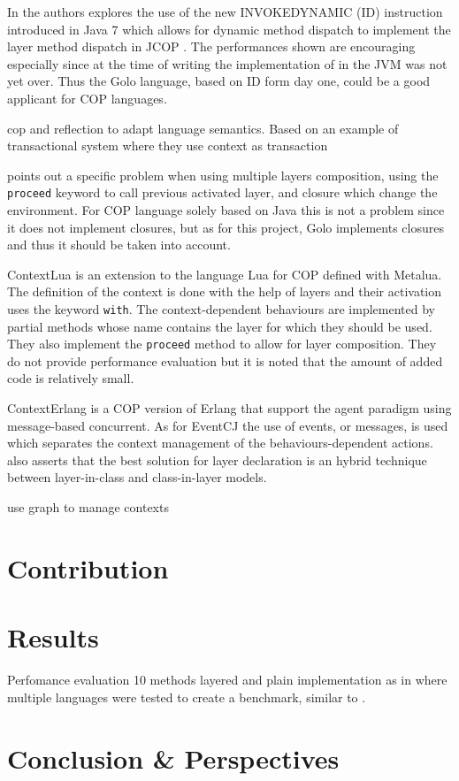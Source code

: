 \documentclass[a4paper]{article}
\begin{document}
In \cite{appeltauer_layered_2010} the authors explores the use of the new INVOKEDYNAMIC (ID) instruction introduced in Java 7 which allows for dynamic method dispatch to implement the layer method dispatch in JCOP \cite{appeltauer_declarative_2013}. The performances shown are encouraging especially since at the time of writing the implementation of in the JVM was not yet over. Thus the Golo language, based on ID form day one, could be a good applicant for COP languages.

\cite{gonzalez_transactional_2009} cop and reflection to adapt language semantics. Based on an example of transactional system where they use context as transaction

\cite{clarke_how_2009} points out a specific problem when using multiple layers composition, using the \lstinline|proceed| keyword to call previous activated layer, and closure which change the environment. For COP language solely based on Java this is not a problem since it does not implement closures, but as for this project, Golo implements closures and thus it should be taken into account. 

ContextLua \cite{wasty_contextlua:_2010} is an extension to the language Lua for COP defined with Metalua. The definition of the context is done with the help of layers and their activation uses the keyword \lstinline|with|. The context-dependent behaviours are implemented by partial methods whose name contains the layer for which they should be used. They also implement the \lstinline|proceed| method to allow for layer composition. They do not provide performance evaluation but it is noted that the amount of added code is relatively small.

ContextErlang \cite{ghezzi_context_2010} is a COP version of Erlang that support the agent paradigm using message-based concurrent. As for EventCJ \cite{kamina_eventcj:_2011} the use of events, or messages, is used which separates the context management of the behaviours-dependent actions.  \cite{ghezzi_context_2010} also asserts that the best solution for layer declaration is an hybrid technique between layer-in-class and class-in-layer models.

\cite{schippers_graph-based_2010} use graph to manage contexts

 
\section{Contribution}

\section{Results}

Perfomance evaluation
10 methods layered and plain implementation as in \cite{appeltauer_comparison_2009} where multiple languages were tested to create a benchmark, similar to \cite{kamina_eventcj:_2011}.

\section{Conclusion \& Perspectives}

%
%



\end{document}
